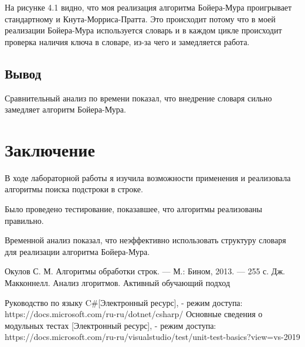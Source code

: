 \documentclass[12pt]{report}
\begin{document}
На рисунке 4.1 видно, что моя реализация алгоритма Бойера-Мура проигрывает стандартному и Кнута-Морриса-Пратта.
Это происходит потому что в моей реализации Бойера-Мура используется словарь и в каждом цикле происходит проверка наличия ключа в словаре, из-за чего
и замедляется работа. 

\section*{Вывод}
Сравнительный анализ по времени показал, что внедрение словаря сильно замедляет алгоритм Бойера-Мура.



\chapter*{Заключение}
В ходе лабораторной работы я изучила возможности применения и реализовала алгоритмы поиска подстроки в строке. 

Было проведено тестирование, показавшее, что алгоритмы реализованы правильно.

Временной анализ показал, что неэффективно использовать структуру словаря для реализации алгоритма Бойера-Мура.


 \begin{thebibliography}{3}
 Окулов С. М. Алгоритмы обработки строк. — М.: Бином, 2013. — 255 с.
 Дж. Макконнелл. Анализ лгоритмов. Активный обучающий подход

Руководство по языку C\#[Электронный ресурс], - режим доступа: https://docs.microsoft.com/ru-ru/dotnet/csharp/
Основные сведения о модульных тестах [Электронный ресурс], - режим доступа: https://docs.microsoft.com/ru-ru/visualstudio/test/unit-test-basics?view=vs-2019
\end{thebibliography}
\end{document}
